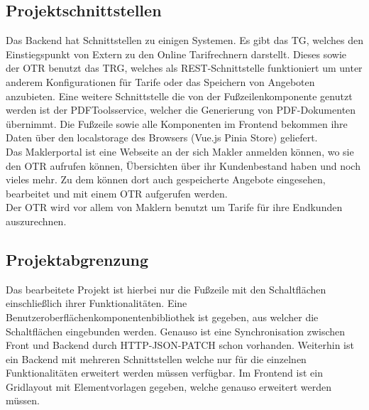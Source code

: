 \subsection{Projektschnittstellen}
\label{projektschnittstellen}
Das Backend hat Schnittstellen zu einigen Systemen. Es gibt das \ac{TG}, welches den Einstiegspunkt von Extern zu den Online Tarifrechnern darstellt. Dieses sowie der \ac{OTR} benutzt das \ac{TRG}, welches als REST-Schnittstelle funktioniert um unter anderem Konfigurationen für Tarife oder das Speichern von Angeboten anzubieten.
Eine weitere Schnittstelle die von der Fußzeilenkomponente genutzt werden ist der PDFToolsservice, welcher die Generierung von PDF-Dokumenten übernimmt. Die Fußzeile sowie alle Komponenten im Frontend bekommen ihre Daten über den \gls{localstorage} des Browsers (Vue.js Pinia Store) geliefert.\\
Das Maklerportal ist eine Webseite an der sich Makler anmelden können, wo sie den \ac{OTR} aufrufen können, Übersichten über ihr Kundenbestand haben und noch vieles mehr. Zu dem können dort auch gespeicherte Angebote eingesehen, bearbeitet und mit einem \ac{OTR} aufgerufen werden.\\
Der \ac{OTR} wird vor allem von Maklern benutzt um Tarife für ihre Endkunden auszurechnen.


\subsection{Projektabgrenzung}
\label{projektabgrenzung}
Das bearbeitete Projekt ist hierbei nur die Fußzeile mit den Schaltflächen einschließlich ihrer Funktionalitäten. Eine Benutzeroberflächenkomponentenbibliothek ist gegeben, aus welcher die Schaltflächen eingebunden werden. Genauso ist eine Synchronisation zwischen Front und Backend durch HTTP-JSON-PATCH schon vorhanden. Weiterhin ist ein Backend mit mehreren Schnittstellen welche nur für die einzelnen Funktionalitäten erweitert werden müssen verfügbar. Im Frontend ist ein Gridlayout mit Elementvorlagen gegeben, welche genauso erweitert werden müssen.